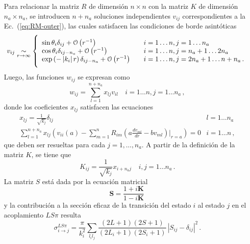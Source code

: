 Para relacionar la matriz $R$ de dimensión $n\times n$ con la matriz 
$K$ de dimensión $n_a\times n_a$, se introducen $n+n_a$ soluciones 
independientes $v_{ij}$ correspondientes a la Ec.~(\ref{eq:RM-outer}), 
las cuales satisfacen las condiciones de borde asintóticas
\begin{equation}
v_{ij}\underset{r \rightarrow \infty}{\sim} \vast\{
\begin{array}{ll}
\sin\theta_i\delta_{ij}+\mathcal{O}\left(r^{-1}\right) 
&\quad i=1\ldots n,j=1\ldots n_a \\
\cos\theta_{i}\delta_{ij-n_a}+\mathcal{O}\left(r^{-1}\right) 
&\quad i=1\ldots n,j=n_a+1\ldots 2n_a \\
\exp\left(-\left|k_i\right|r\right)\delta_{ij-n_a}+\mathcal{O}\left(r^{-1}\right)
&\quad i=1\ldots n,j=2n_a+1\ldots n+n_a\,.
\end{array}
\end{equation}
Luego, las funciones $w_{ij}$ se expresan como
\begin{equation}
w_{ij}=\sum_{l=1}^{n+n_a}x_{lj}v_{il}\quad i=1 \ldots n, j=1 \ldots n_a\,,
\end{equation}
donde los coeficientes $x_{lj}$ satisfacen las ecuaciones
\begin{equation}
\begin{array}{cl}
x_{lj}=\frac{1}{\sqrt{k_j}} \delta_{lj} & l=1 \ldots n_a \\
\sum_{l=1}^{n+n_a} x_{lj}\left(v_{ii}(a)-\sum_{m=1}^n R_{im}
\left(a\frac{d v_{ml}}{dr}-b v_{ml}\right)\bigg|_{r=a}\right)=0 & 
i=1 \ldots n\,,
\end{array}
\end{equation}
que deben ser resueltas para cada $j=1,\dots,n_a$. A partir de la
definición de la matriz $K$, se tiene que
\begin{equation}
K_{ij}=\frac{1}{\sqrt{k_j}} x_{i+n_aj} \quad i,j=1 \ldots n_a\,.
\end{equation}
La matriz $S$ está dada por la ecuación matricial
\begin{equation}
\mathbf{S}=\frac{1+i \mathbf{K}}{1-i \mathbf{K}}\,
\end{equation}
y la contribución a la sección eficaz de la transición del estado $i$ 
al estado $j$ en el acoplamiento $LS\pi$ resulta
\begin{equation}
\sigma_{i \rightarrow j}^{LS\pi}=\frac{\pi}{k_i^2} \sum_{l_il_j} 
\frac{(2L+1)(2S+1)}{\left(2L_i+1\right)\left(2S_i+1\right)}\,
\left|S_{ij}-\delta_{ij}\right|^{2}\,.
\end{equation}

